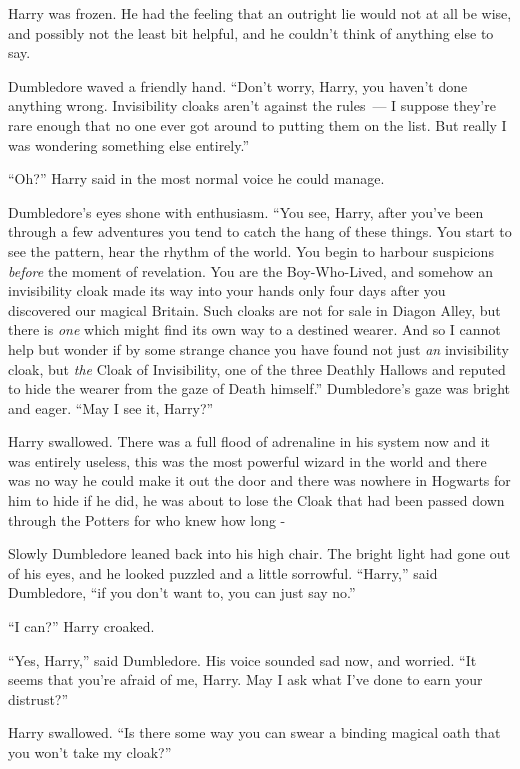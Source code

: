 Harry was frozen. He had the feeling that an outright lie would not at all be wise, and possibly not the least bit helpful, and he couldn't think of anything else to say.

Dumbledore waved a friendly hand. ``Don't worry, Harry, you haven't done anything wrong. Invisibility cloaks aren't against the rules~--- I suppose they're rare enough that no one ever got around to putting them on the list. But really I was wondering something else entirely.''

``Oh?'' Harry said in the most normal voice he could manage.

Dumbledore's eyes shone with enthusiasm. ``You see, Harry, after you've been through a few adventures you tend to catch the hang of these things. You start to see the pattern, hear the rhythm of the world. You begin to harbour suspicions \emph{before} the moment of revelation. You are the Boy-Who-Lived, and somehow an invisibility cloak made its way into your hands only four days after you discovered our magical Britain. Such cloaks are not for sale in Diagon Alley, but there is \emph{one} which might find its own way to a destined wearer. And so I cannot help but wonder if by some strange chance you have found not just \emph{an} invisibility cloak, but \emph{the} Cloak of Invisibility, one of the three Deathly Hallows and reputed to hide the wearer from the gaze of Death himself.'' Dumbledore's gaze was bright and eager. ``May I see it, Harry?''

Harry swallowed. There was a full flood of adrenaline in his system now and it was entirely useless, this was the most powerful wizard in the world and there was no way he could make it out the door and there was nowhere in Hogwarts for him to hide if he did, he was about to lose the Cloak that had been passed down through the Potters for who knew how long -

Slowly Dumbledore leaned back into his high chair. The bright light had gone out of his eyes, and he looked puzzled and a little sorrowful. ``Harry,'' said Dumbledore, ``if you don't want to, you can just say no.''

``I can?'' Harry croaked.

``Yes, Harry,'' said Dumbledore. His voice sounded sad now, and worried. ``It seems that you're afraid of me, Harry. May I ask what I've done to earn your distrust?''

Harry swallowed. ``Is there some way you can swear a binding magical oath that you won't take my cloak?''

